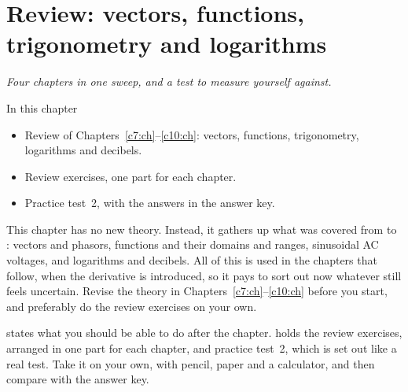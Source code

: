 
\chapter{Review: vectors, functions, trigonometry and logarithms}
\label{c11:ch}

{\large\itshape Four chapters in one sweep, and a test to measure yourself against.\par}

\begin{chapterbox}{In this chapter}
\begin{itemize}
  \item Review of Chapters~\ref{c7:ch}--\ref{c10:ch}: vectors, functions, trigonometry,
    logarithms and decibels.
  \item Review exercises, one part for each chapter.
  \item Practice test~2, with the answers in the answer key.
\end{itemize}
\end{chapterbox}

This chapter has no new theory. Instead, it gathers up what was covered from  to
: vectors and phasors, functions and their domains and ranges, sinusoidal AC voltages,
and logarithms and decibels. All of this is used in the chapters that follow, when the derivative
is introduced, so it pays to sort out now whatever still feels uncertain. Revise the theory in
Chapters~\ref{c7:ch}--\ref{c10:ch} before you start, and preferably do the review exercises on
your own.

 states what you should be able to do after the chapter.
 holds the review exercises, arranged in one part for each chapter, and
 practice test~2, which is set out like a real test. Take it on your
own, with pencil, paper and a calculator, and then compare with the answer key.




